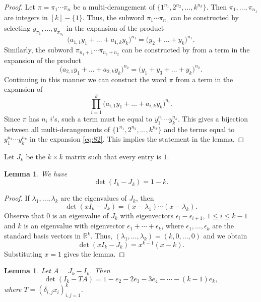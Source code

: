 \documentclass[oneside]{book}
\numberwithin{equation}{section}
\newtheorem{lem}[thm]{Lemma}
\theoremstyle{definition}
\newcommand{\RR}{\mathbb{R}}
\begin{document}
\begin{proof}
  Let \( \pi=\pi_1 \cdots \pi_n \) be a multi-derangement of
  \(\{1^{n_1}, 2^{n_2},\dots,k^{n_k}\}\). Then
  \( \pi_1,\dots,\pi_{n_1} \) are integers in \( [k]-\{1\} \).
  Thus, the subword \( \pi_1\cdots\pi_{n_1} \)
  can be constructed by selecting \( y_{\pi_1},\dots,y_{\pi_{n_1}} \)
  in the expansion of the product
  \[
    \bigl(a_{1,1}y_1 + \dots + a_{1,k}y_k \bigl)^{n_1}
    = \bigl(y_2 + \dots + y_k \bigl)^{n_1}.
  \]
  Similarly, the subword \( \pi_{n_1+1}\cdots\pi_{n_1+n_2} \) can be
  constructed by from a term in the expansion of the product
  \[
    \bigl(a_{2,1}y_1 + \dots + a_{2,k}y_k \bigl)^{n_2}
    = \bigl(y_1+ y_3 + \dots + y_k \bigl)^{n_2}.
  \]
  Continuing in this manner
  we can constuct the word \( \pi \)
  from a term in the expansion of 
  \begin{equation}\label{eq:82}
    \prod_{i=1}^k \bigl(a_{i,1}y_1 + \dots + a_{i,k}y_k \bigl)^{n_i}.
  \end{equation}
  Since \( \pi \) has \( n_i \) \( i \)'s, such a term must be equal
  to \( y_1^{n_1}\cdots y_k^{n_k} \). This gives a bijection between
  all multi-derangements of \(\{1^{n_1}, 2^{n_2},\dots,k^{n_k}\}\) and
  the terms equal to \( y_1^{n_1}\cdots y_k^{n_k} \) in the expansion
  \eqref{eq:82}. This implies the statement in the lemma.
\end{proof}

Let \( J_k \) be the \( k\times k \) matrix such that every entry is
\( 1 \).

\begin{lem}\label{lem:12}
  We have 
  \[
    \det(I_{k}-J_{k}) = 1-k.
  \]
\end{lem}

\begin{proof}
  If \( \lambda_1,\dots,\lambda_k \) are the eigenvalues of
  \( J_k \), then
  \[
    \det(xI_{k}-J_{k}) = (x-\lambda_1) \cdots (x-\lambda_k).
  \]
   Observe that \( 0 \) is an eigenvalue of \( J_k \) with
  eigenvectors \( \epsilon_i-\epsilon_{i+1} \), \( 1\le i\le k-1 \)
  and \( k \) is an eigenvalue with eigenvector
  \( \epsilon_1 + \cdots + \epsilon_k \), where
  \( \epsilon_1,\dots,\epsilon_k \) are the standard basis vectors in
  \( \RR^k \). Thus, \( (\lambda_1,\dots,\lambda_k) = (k,0,\dots,0) \)
  and we obtain
  \[
    \det(xI_{k}-J_{k}) = x^{k-1}(x-k).
  \]
  Substituting \( x=1 \) gives the lemma.
\end{proof}

\begin{lem}\label{lem:14}
  Let \( A = J_k-I_k \). Then
  \[
    \det(I_{k}-TA) = 1-e_2-2e_3-3e_4-\cdots-(k-1)e_k,
  \]
where \( T = (\delta_{i,j}x_i)_{i,j=1}^k \).
\end{lem}
\end{document}
